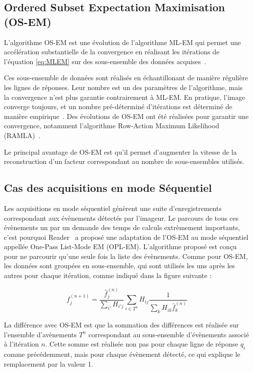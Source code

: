 	\subsection{Ordered Subset Expectation Maximisation (OS-EM)}

L'algorithme OS-EM est une évolution de l'algorithme ML-EM  qui permet une accélération substantielle de la convergence en réalisant les itérations de l'équation \ref{eq:MLEM} sur des sous-ensemble des données acquises~\cite{hudson1994accelerated}. 

Ces sous-ensemble de données sont réalisés en échantillonant de manière régulière les lignes de réponses. Leur nombre est un des paramètres de l'algorithme, mais la convergence n'est plus garantie contrairement à ML-EM. En pratique, l'image converge toujours, et un nombre pré-déterminé d'itérations est déterminé de manière empirique~\cite{bailey2005positron}. Des évolutions de OS-EM ont été réalisées pour garantir une convergence, notamment l'algorithme Row-Action Maximum Likelihood (RAMLA)~\cite{browne1996row, chiang2004clinical}.

Le principal avantage de OS-EM est qu'il permet d'augmenter la vitesse de la reconstruction d'un facteur correspondant au nombre de sous-ensembles utilisés.

	\subsection{Cas des acquisitions en mode Séquentiel}

Les acquisitions en mode séquentiel génèrent une suite d'enregistrements correspondant aux évènements détectés par l'imageur. Le parcours de tous ces évènements un par un demande des temps de calculs extrèmement importants, c'est pourquoi Reader~\cite{reader2002one} a proposé une adaptation de l'OS-EM au mode séquentiel appellée One-Pass List-Mode EM (OPL-EM). L'algorithme proposé est conçu pour ne parcourir qu'une seule fois la liste des évènements. Comme pour OS-EM, les données sont groupées en sous-ensemble, qui sont utilisés les uns après les autres pour chaque itération, comme indiqué dans la figure suivante :

\begin{equation}
	f_j^{(n+1)}=\frac{\hat{f}_j^{(n)}}{\sum\limits_{i'}H_{i'j}}\sum\limits_{i \in T^n}H_{ij}\frac{1}{\sum\limits_{k}H_{ik}\hat{f}_k^{(n)}}
\label{eq:OSEM_seq}
\end{equation}

La différence avec OS-EM est que la sommation des différences est réalisée sur l'ensemble d'avènements $T^n$ correspondant au sous-ensemble d'évènements associé à l'itération $n$. Cette somme est réalisée non pas pour chaque ligne de réponse $q_i$ comme précédemment, mais pour chaque évènement détecté, ce qui explique le remplacement par la valeur 1.
		
